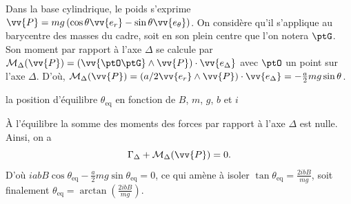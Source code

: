 
\begin{corrige}
Dans la base cylindrique, le poids s'exprime $\vv{P}=mg\left(\cos\theta\vv{e_r}-\sin\theta\vv{e_\theta}\right)$. On considère qu'il s'applique au barycentre des masses du cadre, soit en son plein centre que l'on notera $\ptG$. Son moment par rapport à l'axe $\Delta$ se calcule par $\mathcal{M}_\Delta(\vv{P})=\left(\vv{\ptO\ptG}\land\vv{P}\right)\cdot\vv{e_\Delta}$ avec $\ptO$ un point sur l'axe $\Delta$. D'où, $\mathcal{M}_\Delta(\vv{P})=\left(a/2\vv{e_r}\land\vv{P}\right)\cdot\vv{e_\Delta}=-\frac{a}{2}mg\sin\theta$.
\end{corrige}




\begin{enonce}
la position d'équilibre $\theta_\text{eq}$ en fonction de $B$, $m$, $g$, $b$ et $i$
\end{enonce}


\begin{corrige}
À l'équilibre la somme des moments des forces par rapport à l'axe $\Delta$ est nulle. Ainsi, on a 
\[
\Gamma_\Delta+\mathcal{M}_\Delta(\vv{P})=0.
\]
D'où $iabB\cos\theta_\text{eq}-\frac{a}{2}mg\sin\theta_\text{eq}=0$, ce qui amène à isoler $\tan\theta_\text{eq}=\frac{2ibB}{mg}$, soit finalement $\theta_\text{eq}=\arctan\left(\frac{2ibB}{mg}\right)$.
\end{corrige}

\finEntrainement



\afficheReponsesMelangees

\finFicheEntrainement                                                                        %


\ifdefined\mainIsLoaded\else
\printReponsesEtCorriges
\fi
